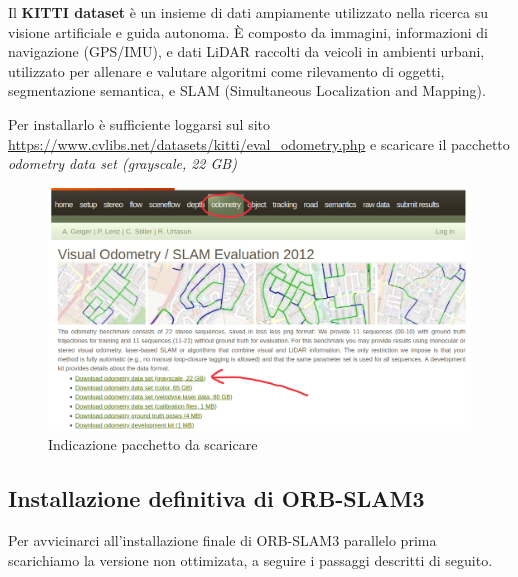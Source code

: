 \documentclass[12pt,a4paper]{report}
\begin{document}
Il \textbf{KITTI dataset} è un insieme di dati ampiamente utilizzato nella ricerca su visione artificiale e guida autonoma. È composto da immagini, informazioni di navigazione (GPS/IMU), e dati LiDAR raccolti da veicoli in ambienti urbani, utilizzato per allenare e valutare algoritmi come rilevamento di oggetti, segmentazione semantica, e SLAM (Simultaneous Localization and Mapping).

Per installarlo è sufficiente loggarsi sul sito \url{https://www.cvlibs.net/datasets/kitti/eval_odometry.php} e scaricare il pacchetto \textit{odometry data set (grayscale, 22 GB)}

\begin{figure}[h]
    \centering
    \includegraphics[width=0.9\linewidth]{img/kitti_dataset.png}
    \caption{Indicazione pacchetto da scaricare}
\end{figure}

\subsection{Installazione definitiva di ORB-SLAM3}

Per avvicinarci all'installazione finale di ORB-SLAM3 parallelo prima scarichiamo la versione non ottimizata, a seguire i passaggi descritti di seguito.
\end{document}

